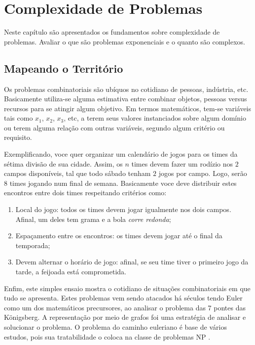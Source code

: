 
\chapter{Complexidade de Problemas}
\label{cp:complexidade}


Neste capítulo são apresentados os fundamentos sobre
complexidade de problemas.  Avaliar o que são problemas
exponenciais e o quanto são complexos.



\section{Mapeando o Territ\'orio}


Os problemas combinatoriais são ubíquos no cotidiano de pessoas, indústria, etc.
Basicamente utiliza-se alguma estimativa entre combinar objetos,
pessoas versus recursos para se atingir algum objetivo.
Em termos matemáticos, tem-se variáveis tais como $x_1$, $x_2$, $x_3$, etc, a terem
seus valores instanciados sobre algum domínio ou terem alguma relação
com outras variáveis, segundo algum critério ou requisito.

Exemplificando, voce quer organizar um calendário de jogos para os times da
sétima divisão de sua cidade. Assim, os $n$ times devem fazer um rodízio
nos $2$ campos disponíveis, tal que todo sábado  tenham $2$ jogos
por campo. Logo, serão $8$ times jogando num final de semana. Basicamente
voce deve distribuir estes encontros entre dois times respeitando critérios
como:
\begin{enumerate}
\item Local do jogo: todos os times devem jogar igualmente nos dois campos.
Afinal, um deles tem grama e a bola \textit{corre redonda};
\item Espaçamento entre os encontros: os times devem jogar até o final
da temporada;
\item Devem alternar o horário de jogo: afinal, se seu time tiver o primeiro
jogo da tarde, a feijoada está comprometida.
\end{enumerate}

Enfim, este simples ensaio mostra o cotidiano de situações combinatoriais
em que tudo se apresenta. Estes problemas vem sendo atacados há séculos tendo 
Euler como um dos matemáticos precursores, ao analisar o problema das 7 pontes 
das  Königsberg. A representação por meio de grafos foi uma estratégia
de analisar e solucionar o problema. O problema do caminho euleriano é
 base de vários estudos, pois sua  tratabilidade o coloca na classe
 de problemas NP \cite{sipser12}.

